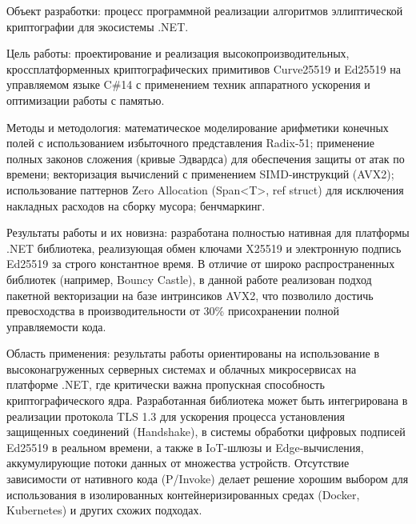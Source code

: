 Объект разработки: процесс программной реализации алгоритмов эллиптической криптографии для экосистемы .NET.

Цель работы: проектирование и реализация высокопроизводительных, кроссплатформенных криптографических примитивов Curve25519 и Ed25519 на управляемом языке C\#14 с применением техник аппаратного ускорения и оптимизации работы с памятью.

Методы и методология: математическое моделирование арифметики конечных полей с использованием избыточного представления Radix-51; применение полных законов сложения (кривые Эдвардса) для обеспечения защиты от атак по времени; векторизация вычислений с применением SIMD-инструкций (AVX2); использование паттернов Zero Allocation (Span<T>, ref struct) для исключения накладных расходов на сборку мусора; бенчмаркинг.

Результаты работы и их новизна: разработана полностью нативная для платформы .NET библиотека, реализующая обмен ключами X25519 \cite{RFC7748} и электронную подпись Ed25519 \cite{RFC8032} за строго константное время. 
В отличие от широко распространенных библиотек (например, Bouncy Castle), в данной работе реализован подход пакетной векторизации на базе интринсиков AVX2, что позволило достичь превосходства в производительности от 30\% присохранении полной управляемости кода.

Область применения: результаты работы ориентированы на использование в высоконагруженных серверных системах и облачных микросервисах на платформе .NET, где критически важна пропускная способность криптографического ядра. Разработанная библиотека может быть интегрирована в реализации протокола TLS 1.3 для ускорения процесса установления защищенных соединений (Handshake), в системы обработки цифровых подписей Ed25519 в реальном времени, а также в IoT-шлюзы и Edge-вычисления, аккумулирующие потоки данных от множества устройств. Отсутствие зависимости от нативного кода (P/Invoke) делает решение хорошим выбором для использования в изолированных контейнеризированных средах (Docker, Kubernetes) и других схожих подходах.
